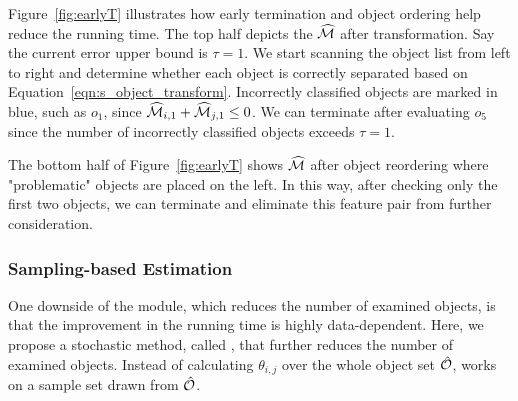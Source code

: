 \begin{example}
Figure~\ref{fig:earlyT} illustrates how early termination and object ordering help reduce the running time. The top half depicts the $\widehat{{\mathcal{M}}}$ after transformation. Say the current error upper bound is $\tau=1$. We start scanning the object list from left to right and determine whether each object is correctly separated based on Equation~\ref{eqn:s_object_transform}. Incorrectly classified objects are marked in blue, such as $o_1$, since $\widehat{{\mathcal{M}}}_{i,1}+\widehat{{\mathcal{M}}}_{j,1}\leq0$. We can terminate after evaluating $o_5$ since the number of incorrectly classified objects exceeds $\tau=1$.

The bottom half of Figure~\ref{fig:earlyT} shows $\widehat{{\mathcal{M}}}$ after object reordering where "problematic" objects are placed on the left. In this way, after checking only the first two objects, we can terminate and eliminate this feature pair from further consideration.
\end{example}


\subsubsection{Sampling-based Estimation} \label{ssec:sampling}

One downside of the \earlyT module, which reduces the number of examined objects, is that the improvement in the running time is highly data-dependent. Here, we propose a stochastic method, called \sampling, that further reduces the number of examined objects. Instead of calculating $\theta_{i,j}$ over the whole object set $\hat{{\mathcal{O}}}$, \sampling works on a sample set drawn from $\hat{{\mathcal{O}}}$.

